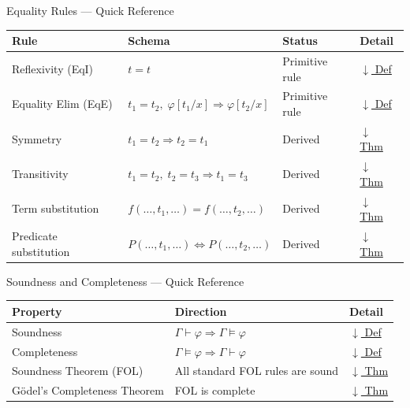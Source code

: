 

\begin{toolkitbox}{Equality Rules --- Quick Reference}
\small
\begin{tabular}{l l l l}
\toprule
\textbf{Rule} & \textbf{Schema} & \textbf{Status} & \textbf{Detail} \\
\midrule
Reflexivity (EqI)   & $t = t$ & Primitive rule & \hyperref[def:eq-refl]{$\downarrow$ Def} \\
Equality Elim (EqE) & $t_1=t_2,\;\varphi[t_1/x] \Rightarrow \varphi[t_2/x]$ & Primitive rule & \hyperref[def:eq-elim]{$\downarrow$ Def} \\
Symmetry            & $t_1=t_2 \Rightarrow t_2=t_1$ & Derived & \hyperref[thm:eq-sym]{$\downarrow$ Thm} \\
Transitivity        & $t_1=t_2,\;t_2=t_3 \Rightarrow t_1=t_3$ & Derived & \hyperref[thm:eq-trans]{$\downarrow$ Thm} \\
Term substitution   & $f(\dots,t_1,\dots)=f(\dots,t_2,\dots)$ & Derived & \hyperref[thm:eq-term]{$\downarrow$ Thm} \\
Predicate substitution & $P(\dots,t_1,\dots)\Leftrightarrow P(\dots,t_2,\dots)$ & Derived & \hyperref[thm:eq-pred]{$\downarrow$ Thm} \\
\bottomrule
\end{tabular}
\end{toolkitbox}



\begin{toolkitbox}{Soundness and Completeness --- Quick Reference}
\small
\begin{tabular}{l l l}
\toprule
\textbf{Property} & \textbf{Direction} & \textbf{Detail} \\
\midrule
Soundness    & $\Gamma \vdash \varphi \Rightarrow \Gamma \models \varphi$ & \hyperref[def:soundness]{$\downarrow$ Def} \\
Completeness & $\Gamma \models \varphi \Rightarrow \Gamma \vdash \varphi$ & \hyperref[def:completeness]{$\downarrow$ Def} \\
Soundness Theorem (FOL) & All standard FOL rules are sound & \hyperref[thm:fol-sound]{$\downarrow$ Thm} \\
G\"{o}del's Completeness Theorem & FOL is complete & \hyperref[thm:godel-complete]{$\downarrow$ Thm} \\
\bottomrule
\end{tabular}
\end{toolkitbox}


